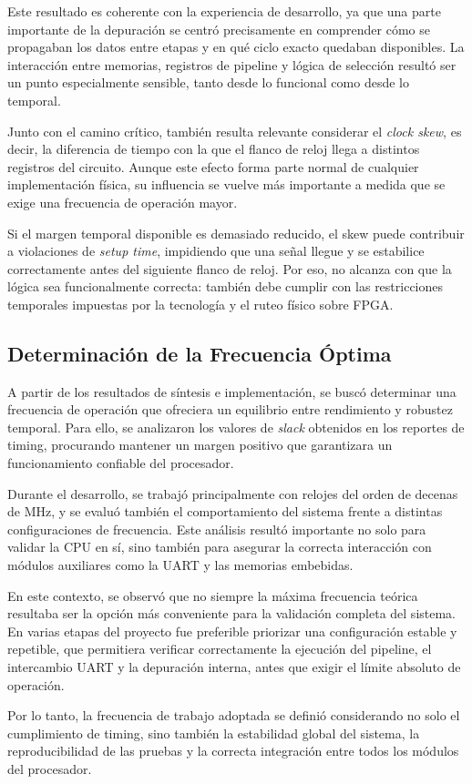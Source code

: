 Este resultado es coherente con la experiencia de desarrollo, ya que una parte importante de la depuración se centró precisamente en comprender cómo se propagaban los datos entre etapas y en qué ciclo exacto quedaban disponibles. La interacción entre memorias, registros de pipeline y lógica de selección resultó ser un punto especialmente sensible, tanto desde lo funcional como desde lo temporal.

Junto con el camino crítico, también resulta relevante considerar el \textit{clock skew}, es decir, la diferencia de tiempo con la que el flanco de reloj llega a distintos registros del circuito. Aunque este efecto forma parte normal de cualquier implementación física, su influencia se vuelve más importante a medida que se exige una frecuencia de operación mayor.

Si el margen temporal disponible es demasiado reducido, el skew puede contribuir a violaciones de \textit{setup time}, impidiendo que una señal llegue y se estabilice correctamente antes del siguiente flanco de reloj. Por eso, no alcanza con que la lógica sea funcionalmente correcta: también debe cumplir con las restricciones temporales impuestas por la tecnología y el ruteo físico sobre FPGA.

\subsection{Determinación de la Frecuencia Óptima}
A partir de los resultados de síntesis e implementación, se buscó determinar una frecuencia de operación que ofreciera un equilibrio entre rendimiento y robustez temporal. Para ello, se analizaron los valores de \textit{slack} obtenidos en los reportes de timing, procurando mantener un margen positivo que garantizara un funcionamiento confiable del procesador.

Durante el desarrollo, se trabajó principalmente con relojes del orden de decenas de MHz, y se evaluó también el comportamiento del sistema frente a distintas configuraciones de frecuencia. Este análisis resultó importante no solo para validar la CPU en sí, sino también para asegurar la correcta interacción con módulos auxiliares como la UART y las memorias embebidas.

En este contexto, se observó que no siempre la máxima frecuencia teórica resultaba ser la opción más conveniente para la validación completa del sistema. En varias etapas del proyecto fue preferible priorizar una configuración estable y repetible, que permitiera verificar correctamente la ejecución del pipeline, el intercambio UART y la depuración interna, antes que exigir el límite absoluto de operación.

Por lo tanto, la frecuencia de trabajo adoptada se definió considerando no solo el cumplimiento de timing, sino también la estabilidad global del sistema, la reproducibilidad de las pruebas y la correcta integración entre todos los módulos del procesador.
